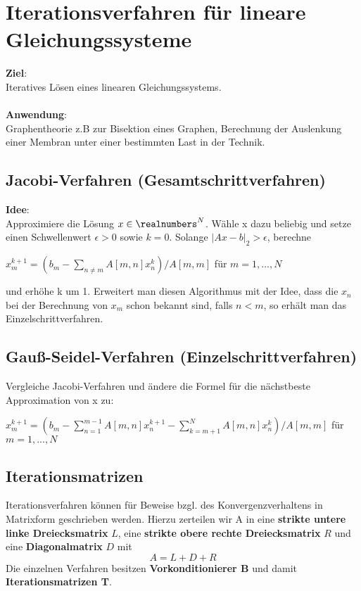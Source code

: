 \section{Iterationsverfahren für lineare Gleichungssysteme}%
\label{itl:sec:iterationsverfahren}
\textbf{Ziel}:\\Iteratives Lösen eines linearen Gleichungssystems.\\\\
\textbf{Anwendung}:\\Graphentheorie z.B zur Bisektion eines Graphen, Berechnung der Auslenkung einer Membran unter einer bestimmten Last in der Technik.
\subsection{Jacobi-Verfahren (Gesamtschrittverfahren)}%
\label{itl:sub:jacobi-verfahren}
\textbf{Idee}:\\Approximiere die Lösung $x \in \realnumbers^N$. Wähle x dazu beliebig und setze einen Schwellenwert $\epsilon > 0$ sowie $k = 0$. Solange $|Ax - b|_2 > \epsilon$, berechne
\begin{center}
	$x^{k+1}_m = (b_m - \sum_{n \neq m}^{} A[m, n]x_n^k) / A[m, m]$ für $m = 1, ..., N$
\end{center}
und erhöhe k um 1. Erweitert man diesen Algorithmus mit der Idee, dass die $x_n$ bei der Berechnung von $x_m$ schon bekannt sind, falls $n < m$, so erhält man das Einzelschrittverfahren.
\subsection{Gauß-Seidel-Verfahren (Einzelschrittverfahren)}%
\label{itl:sub:gauss-seidel-verfahren}
Vergleiche Jacobi-Verfahren und ändere die Formel für die nächstbeste Approximation von x zu:
\begin{center}
	$x^{k+1}_m = (b_m - \sum_{n = 1}^{m - 1}A[m, n]x^{k+1}_n - \sum_{k = m + 1}^{N}A[m, n]x_n^k) / A[m, m]$ für $m = 1, ..., N$
\end{center}

\subsection{Iterationsmatrizen}%
\label{itl:sub:iterationsmatrizen}
Iterationsverfahren können für Beweise bzgl. des Konvergenzverhaltens in Matrixform geschrieben werden. Hierzu zerteilen wir A in eine \textbf{strikte untere linke Dreiecksmatrix} $L$, eine \textbf{strikte obere rechte Dreiecksmatrix} $R$ und eine \textbf{Diagonalmatrix} $D$ mit $$A = L + D + R$$
Die einzelnen Verfahren besitzen \textbf{Vorkonditionierer B} und damit \textbf{Iterationsmatrizen T}.\\\\

